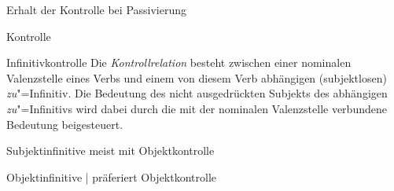 \begin{frame}
  {Erhalt der Kontrolle bei Passivierung}
\begin{exe}
  \ex\label{ex:infinitivkontrolle270}
  \begin{xlist}
  \end{xlist}
\end{exe}
\end{frame}

\begin{frame}
  {Kontrolle}
  \begin{block}
    {Infinitivkontrolle}
Die \textit{Kontrollrelation} besteht zwischen einer nominalen Valenzstelle eines Verbs und einem von diesem Verb abhängigen (subjektlosen) \textit{zu}"=Infinitiv.
Die Bedeutung des nicht ausgedrückten Subjekts des abhängigen \textit{zu}"=Infinitivs wird dabei durch die mit der nominalen Valenzstelle verbundene Bedeutung beigesteuert.
  \end{block}
\end{frame}


\begin{frame}
  {Subjektinfinitive meist mit Objektkontrolle}
  \begin{exe}
  \ex\label{ex:infinitivkontrolle274}
  \begin{xlist}
  \end{xlist}
\end{exe}
\end{frame}

\begin{frame}
  {Objektinfinitive | präferiert Objektkontrolle}
  \begin{exe}
  \ex\label{ex:infinitivkontrolle279}
  \begin{xlist}
  \end{xlist}
\end{exe}
\end{frame}


